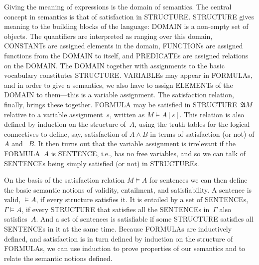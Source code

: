 \documentclass[10pt,a4paper]{article}
\newcommand*{\olup}[1]{\MakeUppercase{#1}}
\theoremstyle{plain}
\theoremstyle{definition}
\theoremstyle{remark}
\newcommand*{\olfileid}[3]{}
\providecommand{\Entails}{\mathrel{\models}}
\providecommand{\Struct}{\ensuremath{\mathfrak{A}}}
\providecommand{\Sat}[2]{\ensuremath{#1 \models #2}}
\begin{document}
Giving the meaning of expressions is the domain of semantics.  The
central concept in semantics is that of satisfaction in
\olup{structure}. \olup{structure} gives meaning to the building blocks
of the language: \olup{domain} is a non-empty set of objects. The
quantifiers are interpreted as ranging over this domain, \olup{constant}s
are assigned elements in the domain, \olup{function}s are assigned
functions from the \olup{domain} to itself, and \olup{predicate}s are
assigned relations on the \olup{domain}.  The \olup{domain} together with
assignments to the basic vocabulary constitutes
\olup{structure}. \olup{variable}s may appear in \olup{formula}s, and in
order to give a semantics, we also have to assign \olup{element}s of the
\olup{domain} to them---this is a variable assignment. The satisfaction
relation, finally, brings these together. \olup{formula} may be satisfied
in \olup{structure}~$\Struct{M}$ relative to a variable assignment~$s$,
written as $\Sat{M}{A}[s]$. This relation is also defined by
induction on the structure of~$A$, using the truth tables for the
logical connectives to define, say, satisfaction of $A \land B$ in
terms of satisfaction (or not) of $A$ and ~$B$.  It then turns out
that the variable assignment is irrelevant if the \olup{formula}~$A$ is
\olup{sentence}, i.e., has no free variables, and so we can talk of
\olup{sentence}s being simply satisfied (or not) in \olup{structure}s.

On the basis of the satisfaction relation $\Sat{M}{A}$ for sentences
we can then define the basic semantic notions of validity, entailment,
and satisfiability.  A sentence is valid, $\Entails A$, if every
structure satisfies it. It is entailed by a set of \olup{sentence}s,
$\Gamma \Entails A$, if every \olup{structure} that satisfies all the
\olup{sentence}s in~$\Gamma$ also satisfies~$A$. And a set of sentences
is satisfiable if some \olup{structure} satisfies all \olup{sentence}s in it
at the same time.  Because \olup{formula}s are inductively defined, and
satisfaction is in turn defined by induction on the structure of
\olup{formula}s, we can use induction to prove properties of our
semantics and to relate the semantic notions defined.








\olfileid{fol}{syn}{mai}
\end{document}
